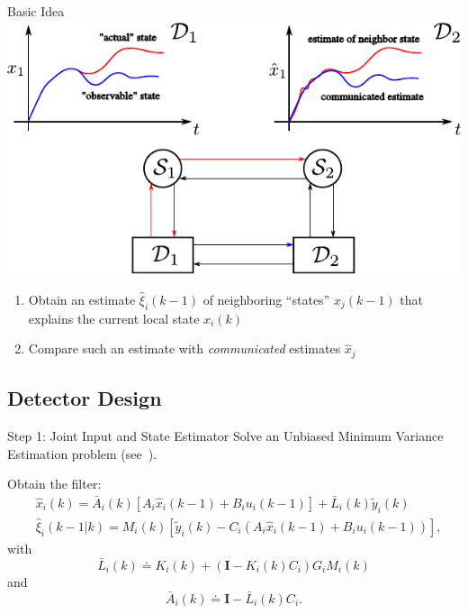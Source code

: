 \documentclass[presentation]{beamer}
\begin{document}
\begin{frame}{Basic Idea}
\centering
\vspace{1.5ex}
\includegraphics[height=0.5\paperheight]{fig/cdc-concept.pdf}
\vspace{1.5ex}
\begin{block}{}
\begin{enumerate}
    \item Obtain an estimate $\hat\xi_i(k-1)$ of neighboring ``states'' $x_j(k-1)$ that explains the current local state $x_i(k)$
    \item Compare such an estimate with \emph{communicated} estimates $\hat x_j$
\end{enumerate}
\end{block}
\end{frame}

\subsection{Detector Design}

\begin{frame}{Step 1: Joint Input and State Estimator}
Solve an Unbiased Minimum Variance Estimation problem (see~\cite{kitanidis1987unbiased,gillijns2007unbiased}).

\bigskip
Obtain the filter:
\begin{align*}
        &\hat{x}_i(k) =  \bar{A}_i(k)\left[A_i\hat{x}_i(k-1) + B_i u_i(k-1)\right] + \bar L_i(k) \tilde y_i(k) \\
	    &\hat{\xi}_i(k-1|k) = M_i(k)\left[\tilde{y}_i(k) - C_i \left(A_i\hat{x}_i(k-1) + B_i u_i(k-1)\right) \right],
\end{align*}
with 
$$
     \bar{L}_i(k) \doteq K_i(k) + \left(\mathbf{I} - K_i(k) C_i \right)G_iM_i(k)
$$ 
and
$$
     \bar{A}_i(k) \doteq \mathbf{I} - \bar{L}_i(k)C_i.
$$
\end{frame}
\end{document}
